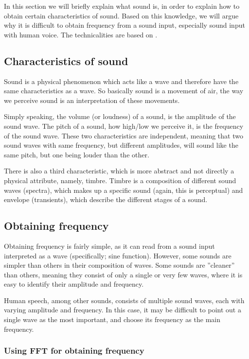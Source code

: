 In this section we will briefly explain what sound is, in order to explain how to obtain certain characteristics of sound.
Based on this knowledge, we will argue why it is difficult to obtain frequency from a sound input, especially sound input with human voice.
The technicalities are based on \cite{music-and-computers}.

\subsection{Characteristics of sound}
Sound is a physical phenomenon which acts like a wave and therefore have the same characteristics as a wave.
So basically sound is a movement of air, the way we perceive sound is an interpretation of these movements.

Simply speaking, the volume (or loudness) of a sound, is the amplitude of the sound wave.
The pitch of a sound, how high/low we perceive it, is the frequency of the sound wave.
These two characteristics are independent, meaning that two sound waves with same frequency, but different amplitudes, will sound like the same pitch, but one being louder than the other.

There is also a third characteristic, which is more abstract and not directly a physical attribute, namely, timbre.
Timbre is a composition of different sound waves (spectra), which makes up a specific sound (again, this is perceptual) and envelope (transients), which describe the different stages of a sound.

\subsection{Obtaining frequency}
Obtaining frequency is fairly simple, as it can read from a sound input interpreted as a wave (specifically; sine function).
However, some sounds are simpler than others in their composition of waves.
Some sounds are ''cleaner'' than others, meaning they consist of only a single or very few waves, where it is easy to identify their amplitude and frequency.

Human speech, among other sounds, consists of multiple sound waves, each with varying amplitude and frequency.
In this case, it may be difficult to point out a single wave as the most important, and choose its frequency as the main frequency.

\subsubsection{Using FFT for obtaining frequency}
